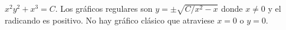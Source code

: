 $x^2y^2+x^3=C$. Los gráficos regulares son $y=\pm\sqrt{C/x^2-x}$ donde $x\ne0$ y el radicando es positivo. No hay gráfico clásico que atraviese $x=0$ o $y=0$.
